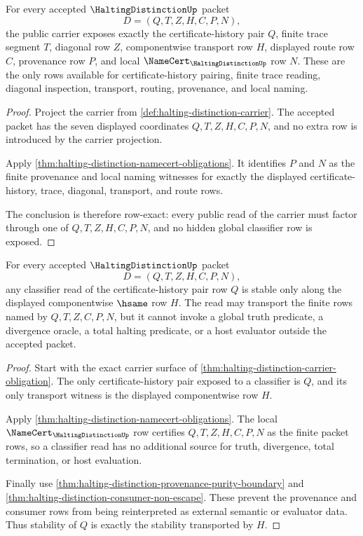 \begin{theorem}
\label{thm:halting-distinction-carrier-obligation}
For every accepted $\HaltingDistinctionUp$ packet
$$
D=(Q,T,Z,H,C,P,N),
$$
the public carrier exposes exactly the certificate-history pair $Q$, finite trace segment $T$, diagonal row $Z$, componentwise transport row $H$, displayed route row $C$, provenance row $P$, and local $\NameCert_{\HaltingDistinctionUp}$ row $N$. These are the only rows available for certificate-history pairing, finite trace reading, diagonal inspection, transport, routing, provenance, and local naming.
\end{theorem}
\begin{proof}
Project the carrier from \autoref{def:halting-distinction-carrier}. The accepted packet has the seven displayed coordinates $Q,T,Z,H,C,P,N$, and no extra row is introduced by the carrier projection.

Apply \autoref{thm:halting-distinction-namecert-obligations}. It identifies $P$ and $N$ as the finite provenance and local naming witnesses for exactly the displayed certificate-history, trace, diagonal, transport, and route rows.

The conclusion is therefore row-exact: every public read of the carrier must factor through one of $Q,T,Z,H,C,P,N$, and no hidden global classifier row is exposed.
\end{proof}

\begin{theorem}
\label{thm:halting-distinction-classifier-stability}
For every accepted $\HaltingDistinctionUp$ packet
$$
D=(Q,T,Z,H,C,P,N),
$$
any classifier read of the certificate-history pair row $Q$ is stable only along the displayed componentwise $\hsame$ row $H$. The read may transport the finite rows named by $Q,T,Z,C,P,N$, but it cannot invoke a global truth predicate, a divergence oracle, a total halting predicate, or a host evaluator outside the accepted packet.
\end{theorem}
\begin{proof}
Start with the exact carrier surface of \autoref{thm:halting-distinction-carrier-obligation}. The only certificate-history pair exposed to a classifier is $Q$, and its only transport witness is the displayed componentwise row $H$.

Apply \autoref{thm:halting-distinction-namecert-obligations}. The local $\NameCert_{\HaltingDistinctionUp}$ row certifies $Q,T,Z,H,C,P,N$ as the finite packet rows, so a classifier read has no additional source for truth, divergence, total termination, or host evaluation.

Finally use \autoref{thm:halting-distinction-provenance-purity-boundary} and \autoref{thm:halting-distinction-consumer-non-escape}. These prevent the provenance and consumer rows from being reinterpreted as external semantic or evaluator data. Thus stability of $Q$ is exactly the stability transported by $H$.
\end{proof}

